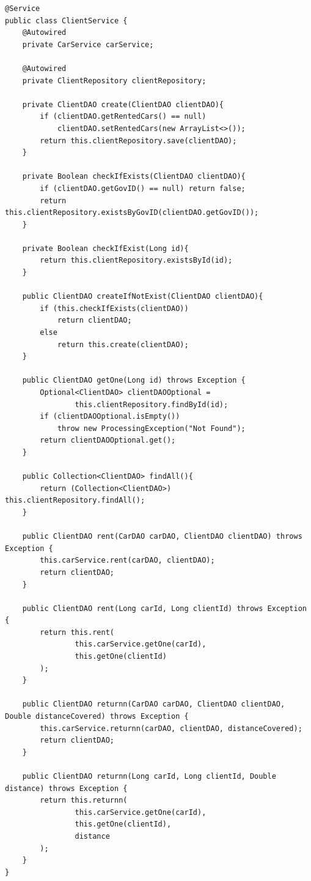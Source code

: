 \documentclass{article}
\begin{document}
        \begin{verbatim}
@Service
public class ClientService {
    @Autowired
    private CarService carService;

    @Autowired
    private ClientRepository clientRepository;

    private ClientDAO create(ClientDAO clientDAO){
        if (clientDAO.getRentedCars() == null)
            clientDAO.setRentedCars(new ArrayList<>());
        return this.clientRepository.save(clientDAO);
    }

    private Boolean checkIfExists(ClientDAO clientDAO){
        if (clientDAO.getGovID() == null) return false;
        return this.clientRepository.existsByGovID(clientDAO.getGovID());
    }

    private Boolean checkIfExist(Long id){
        return this.clientRepository.existsById(id);
    }

    public ClientDAO createIfNotExist(ClientDAO clientDAO){
        if (this.checkIfExists(clientDAO))
            return clientDAO;
        else
            return this.create(clientDAO);
    }

    public ClientDAO getOne(Long id) throws Exception {
        Optional<ClientDAO> clientDAOOptional =
                this.clientRepository.findById(id);
        if (clientDAOOptional.isEmpty())
            throw new ProcessingException("Not Found");
        return clientDAOOptional.get();
    }

    public Collection<ClientDAO> findAll(){
        return (Collection<ClientDAO>) this.clientRepository.findAll();
    }

    public ClientDAO rent(CarDAO carDAO, ClientDAO clientDAO) throws Exception {
        this.carService.rent(carDAO, clientDAO);
        return clientDAO;
    }

    public ClientDAO rent(Long carId, Long clientId) throws Exception {
        return this.rent(
                this.carService.getOne(carId),
                this.getOne(clientId)
        );
    }

    public ClientDAO returnn(CarDAO carDAO, ClientDAO clientDAO, Double distanceCovered) throws Exception {
        this.carService.returnn(carDAO, clientDAO, distanceCovered);
        return clientDAO;
    }

    public ClientDAO returnn(Long carId, Long clientId, Double distance) throws Exception {
        return this.returnn(
                this.carService.getOne(carId),
                this.getOne(clientId),
                distance
        );
    }
}
        \end{verbatim}
        
\end{document}

